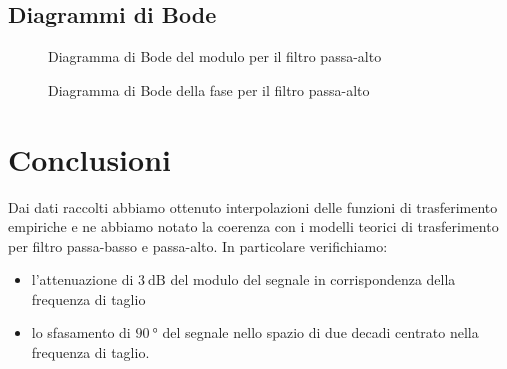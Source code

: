 \documentclass{article}
\begin{document}
\subsection{Diagrammi di Bode}

\begin{figure}[H]
  \caption{Diagramma di Bode del modulo per il filtro passa-alto}
\end{figure}
\begin{figure}[H]
  \caption{Diagramma di Bode della fase per il filtro passa-alto}
\end{figure}

\section{Conclusioni}
Dai dati raccolti abbiamo ottenuto interpolazioni delle funzioni di trasferimento empiriche 
e ne abbiamo notato la coerenza con i modelli teorici di trasferimento per filtro passa-basso e passa-alto.
In particolare verifichiamo:
\begin{itemize}
	\item l'attenuazione di $\SI{3}{\dB}$ del modulo del segnale in corrispondenza della frequenza di taglio  
	\item lo sfasamento di $\SI{90}{\degree}$ del segnale nello spazio di due decadi centrato nella frequenza di taglio.
\end{itemize}
\end{document}
